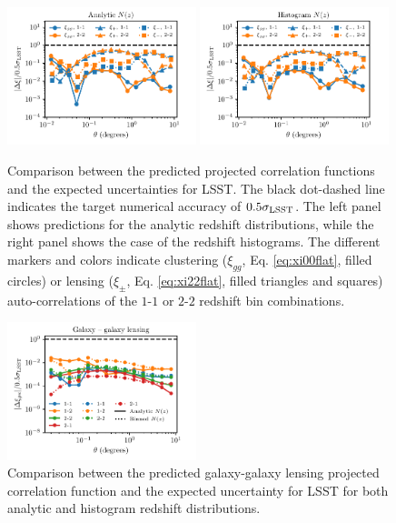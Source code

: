 \documentclass[\docopts]{\docclass}
\begin{document}
\begin{figure}
\centering
\includegraphics[width=0.49\textwidth]{projected_correlation_error_comparison_analytic} 
\includegraphics[width=0.49\textwidth]{projected_correlation_error_comparison_histo} 
\caption{Comparison between the predicted projected correlation functions and the expected uncertainties for LSST. The black dot-dashed line indicates the target numerical accuracy of $0.5\sigma_{\rm LSST}$. The left panel shows predictions for the analytic redshift distributions, while the right panel shows the case of the redshift histograms. The different markers and colors indicate clustering ($\xi_{gg}$, Eq. \ref{eq:xi00flat}, filled circles) or lensing ($\xi_{\pm}$, Eq. \ref{eq:xi22flat}, filled triangles and squares) auto-correlations of the $1$-$1$ or $2$-$2$ redshift bin combinations.}
\label{fig:corrval}
\end{figure}
\begin{figure}
\centering
\includegraphics[width=0.49\textwidth]{projected_xiggl_error_comparison_bothnz_p5sigma}
\caption{Comparison between the predicted galaxy-galaxy lensing projected correlation function and the expected uncertainty for LSST for both analytic and histogram redshift distributions.}
\label{fig:corrval2}
\end{figure}
\end{document}
